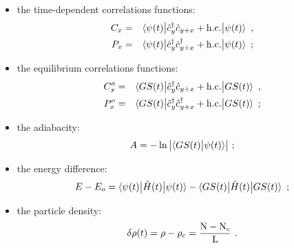 \documentclass[pra,twocolumn,preprintnumbers,amsmath,amssymb,nofootinbib,floatfix]{revtex4}
\DeclarePairedDelimiter{\abs}{\lvert}{\rvert}
\begin{document}
\begin{itemize}

\item the time-dependent correlations functions:
\begin{eqnarray}
\label{tCcorr}
C_x & = & \braket{\psi(t) \big| \hat c^\dagger_y \hat c_{y+x} + {\rm h.c.} 
	\big| \psi(t)}\,\,,\\
\label{tPcorr}
P_x & = & \braket{\psi(t) \big| \hat c^\dagger_y \hat c^\dagger_{y+x} + {\rm h.c.} 
	\big| \psi(t)}\,\,;\\
\end{eqnarray}

\item the equilibrium correlations functions:
\begin{eqnarray}
\label{eCcorr}
C_x^o & = & \braket{GS(t) \big| \hat c^\dagger_y \hat c_{y+x} + {\rm h.c.} 
	\big| GS(t)}\,\,,\\
\label{ePcorr}
P_x^o & = & \braket{GS(t) \big| \hat c^\dagger_y \hat c^\dagger_{y+x} + {\rm h.c.} 
	\big| GS(t)}\,\,;\\
\end{eqnarray}

\item the adiabacity:
\begin{equation}
\label{Adiab}
A = -\ln{ \abs*{\braket{GS(t) \big| \psi(t)}} } \,\,;
\end{equation}
\item the energy difference:
\begin{equation}
\label{Energy}
E - E_o = \braket{ \psi(t) \big| \hat H(t) \big| \psi(t) } - 
\braket{ GS(t) \big| \hat H(t) \big| GS(t) } \,\,;
\end{equation}
\item the particle density:
\begin{equation}
\label{Energy}
\delta \rho(t) = \rho - \rho _c = \frac{ {\rm N - N}_c }{\rm L} \,\,.
\end{equation}
\end{itemize}
\end{document}
